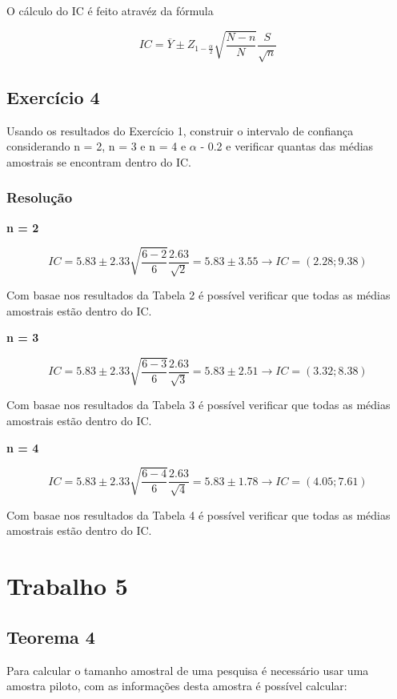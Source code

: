 \documentclass[]{article}
\begin{document}
O cálculo do IC é feito atravéz da fórmula

\[
IC = \overline{Y}\pm Z_{1-\frac{\alpha}{2}}\sqrt{\dfrac{N-n}{N}}\dfrac{S}{\sqrt{n}}
\]

\subsection{Exercício 4}\label{exercicio-4}

Usando os resultados do Exercício 1, construir o intervalo de confiança
considerando n = 2, n = 3 e n = 4 e \(\alpha\) - 0.2 e verificar quantas
das médias amostrais se encontram dentro do IC.

\subsubsection{Resolução}\label{resolucao-3}

\textbf{n = 2}

\[
IC = 5.83\pm 2.33\sqrt{\dfrac{6-2}{6}}\dfrac{2.63}{\sqrt{2}}=5.83\pm 3.55 \rightarrow IC = (2.28;9.38)
\]

Com basae nos resultados da Tabela 2 é possível verificar que todas as
médias amostrais estão dentro do IC.

\textbf{n = 3}

\[
IC = 5.83\pm 2.33\sqrt{\dfrac{6-3}{6}}\dfrac{2.63}{\sqrt{3}}=5.83\pm 2.51 \rightarrow IC = (3.32;8.38)
\]

Com basae nos resultados da Tabela 3 é possível verificar que todas as
médias amostrais estão dentro do IC.

\textbf{n = 4}

\[
IC = 5.83\pm 2.33\sqrt{\dfrac{6-4}{6}}\dfrac{2.63}{\sqrt{4}}=5.83\pm 1.78 \rightarrow IC = (4.05;7.61)
\]

Com basae nos resultados da Tabela 4 é possível verificar que todas as
médias amostrais estão dentro do IC.

\section{Trabalho 5}\label{trabalho-5}

\subsection{Teorema 4}\label{teorema-4}

Para calcular o tamanho amostral de uma pesquisa é necessário usar uma
amostra piloto, com as informações desta amostra é possível calcular:
\end{document}
